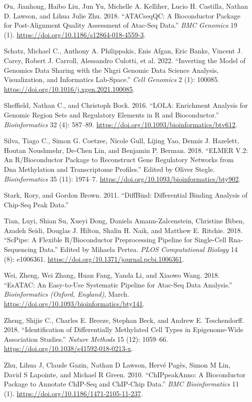 \documentclass[]{article}
\newlength{\cslhangindent}
\newenvironment{cslreferences}%
  {\setlength{\parindent}{0pt}%
  \everypar{\setlength{\hangindent}{\cslhangindent}}\ignorespaces}%
  {\par}
\begin{document}
\begin{cslreferences}
\leavevmode\hypertarget{ref-Ou2018}{}%
Ou, Jianhong, Haibo Liu, Jun Yu, Michelle A. Kelliher, Lucio H. Castilla, Nathan D. Lawson, and Lihua Julie Zhu. 2018. ``ATACseqQC: A Bioconductor Package for Post-Alignment Quality Assessment of Atac-Seq Data.'' \emph{BMC Genomics} 19 (1). \url{https://doi.org/10.1186/s12864-018-4559-3}.

\leavevmode\hypertarget{ref-Schatz2022}{}%
Schatz, Michael C., Anthony A. Philippakis, Enis Afgan, Eric Banks, Vincent J. Carey, Robert J. Carroll, Alessandro Culotti, et al. 2022. ``Inverting the Model of Genomics Data Sharing with the Nhgri Genomic Data Science Analysis, Visualization, and Informatics Lab-Space.'' \emph{Cell Genomics} 2 (1): 100085. \url{https://doi.org/10.1016/j.xgen.2021.100085}.

\leavevmode\hypertarget{ref-Sheffield2016}{}%
Sheffield, Nathan C., and Christoph Bock. 2016. ``LOLA: Enrichment Analysis for Genomic Region Sets and Regulatory Elements in R and Bioconductor.'' \emph{Bioinformatics} 32 (4): 587--89. \url{https://doi.org/10.1093/bioinformatics/btv612}.

\leavevmode\hypertarget{ref-Silva2019}{}%
Silva, Tiago C., Simon G. Coetzee, Nicole Gull, Lijing Yao, Dennis J. Hazelett, Houtan Noushmehr, De-Chen Lin, and Benjamin P. Berman. 2018. ``ELMER V.2: An R/Bioconductor Package to Reconstruct Gene Regulatory Networks from Dna Methylation and Transcriptome Profiles.'' Edited by Oliver Stegle. \emph{Bioinformatics} 35 (11): 1974--7. \url{https://doi.org/10.1093/bioinformatics/bty902}.

\leavevmode\hypertarget{ref-Stark2011}{}%
Stark, Rory, and Gordon Brown. 2011. ``DiffBind: Differential Binding Analysis of Chip-Seq Peak Data.''

\leavevmode\hypertarget{ref-Tian2018}{}%
Tian, Luyi, Shian Su, Xueyi Dong, Daniela Amann-Zalcenstein, Christine Biben, Azadeh Seidi, Douglas J. Hilton, Shalin H. Naik, and Matthew E. Ritchie. 2018. ``ScPipe: A Flexible R/Bioconductor Preprocessing Pipeline for Single-Cell Rna-Sequencing Data.'' Edited by Mihaela Pertea. \emph{PLOS Computational Biology} 14 (8): e1006361. \url{https://doi.org/10.1371/journal.pcbi.1006361}.

\leavevmode\hypertarget{ref-Wei2018}{}%
Wei, Zheng, Wei Zhang, Huan Fang, Yanda Li, and Xiaowo Wang. 2018. ``EsATAC: An Easy-to-Use Systematic Pipeline for Atac-Seq Data Analysis.'' \emph{Bioinformatics (Oxford, England)}, March. \url{https://doi.org/10.1093/bioinformatics/bty141}.

\leavevmode\hypertarget{ref-Zheng2018a}{}%
Zheng, Shijie C., Charles E. Breeze, Stephan Beck, and Andrew E. Teschendorff. 2018. ``Identification of Differentially Methylated Cell Types in Epigenome-Wide Association Studies.'' \emph{Nature Methods} 15 (12): 1059--66. \url{https://doi.org/10.1038/s41592-018-0213-x}.

\leavevmode\hypertarget{ref-Zhu2010}{}%
Zhu, Lihua J, Claude Gazin, Nathan D Lawson, Hervé Pagès, Simon M Lin, David S Lapointe, and Michael R Green. 2010. ``ChIPpeakAnno: A Bioconductor Package to Annotate ChIP-Seq and ChIP-Chip Data.'' \emph{BMC Bioinformatics} 11 (1). \url{https://doi.org/10.1186/1471-2105-11-237}.
\end{cslreferences}
\end{document}
